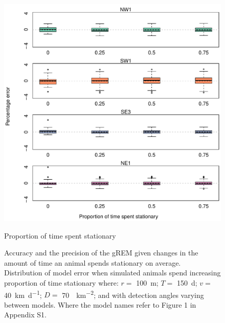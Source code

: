 \documentclass[a4paper,10pt,reqno,oneside]{amsart}
\begin{document}
\begin{figure}[t]
      \centering
	\includegraphics[width=1\textwidth]{imgs/ResultsPerch.pdf}
          \caption{Proportion of time spent stationary}
          \label{f:Perch}
	\caption{Accuracy and the precision of the gREM given changes in the amount of time an animal spends stationary on average. Distribution of model error when simulated animals spend increasing proportion of time stationary where:  $r = $ \SI{100}{\meter}; $T = $ \SI{150}{\day}; $v = $ \SI{40}{\kilo\meter\per\day}; $D = $ \SI{70}{\animals\per\kilo\meter\squared}; and with detection angles varying between models. Where the model names refer to Figure 1 in Appendix S1. } 
\end{figure}
\end{document}
